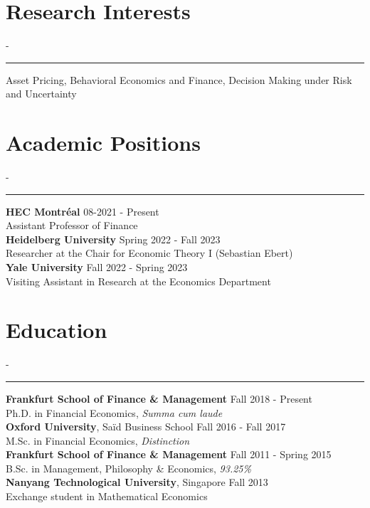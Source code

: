 \documentclass{res}
\newcommand{\sectionline}{	\vspace{-8pt}
	{\parindent-\sectionwidth \rule{\resumewidth}{0.4pt}} }
\begin{document}
 


\address{HEC Montréal\\3000, chemin de la Côte-Sainte-Catherine\\Montréal (Québec)\\Canada H3T 2A7}
\address{Phone: +1 514 340-6424\\ E-mail: maximilian.voigt@hec.ca\\ \href{https://maxvoigt.github.io}{Personal website}}
                                  
\begin{resume}

\section{Research Interests}
    \sectionline
	Asset Pricing, 
    Behavioral Economics and Finance, Decision Making under Risk and Uncertainty
 
\section{Academic Positions} 	
	\sectionline
	\textbf{HEC Montréal} \hfill 08-2021 - Present \\
    Assistant Professor of Finance \medskip \\
	\textbf{Heidelberg University} \hfill Spring 2022 - Fall 2023\\
	Researcher at the Chair for Economic Theory I (Sebastian Ebert)  \medskip \\
	\textbf{Yale University}  \hfill Fall 2022 - Spring 2023\\
	Visiting Assistant in Research at the Economics Department 

\section{Education} 	
	\sectionline
	\textbf{Frankfurt School of Finance \& Management} \hfill Fall 2018 - Present \\
    Ph.D. in Financial Economics, \textit{Summa cum laude} \medskip \\   
	\textbf{Oxford University}, Sa\"{i}d Business School \hfill Fall 2016 - Fall 2017\\
    M.Sc. in Financial Economics, \textit{Distinction} \medskip \\
	\textbf{Frankfurt School of Finance \& Management} \hfill Fall 2011 - Spring 2015\\
    B.Sc. in Management, Philosophy \& Economics, \textit{93.25\%} \medskip \\  
	\textbf{Nanyang Technological University}, Singapore \hfill Fall 2013 \\
    Exchange student in Mathematical Economics
     

\end{resume}
\end{document}
